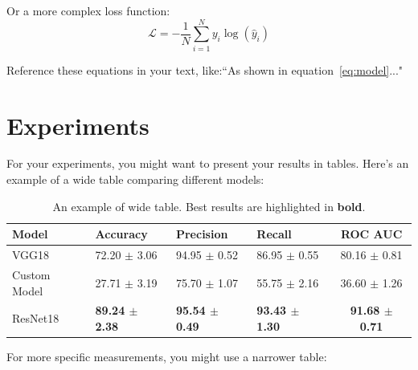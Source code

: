 \documentclass[11pt]{article}
\begin{document}
\begin{multicols*}{2}
        \noindent Or a more complex loss function:
        \begin{equation}
            \label{eq:loss}
            \mathcal{L} = -\frac{1}{N}\sum_{i=1}^{N} y_i\log(\hat{y}_i)
        \end{equation}

        \noindent Reference these equations in your text, like:``As shown in equation~\ref{eq:model}..."

        \section{Experiments}
        For your experiments, you might want to present your results in tables. Here's an example of a wide table comparing different models:

        \begin{table}[t]
            \centering
            \setlength{\tabcolsep}{3pt}
            \caption{An example of wide table. Best results are highlighted in \textbf{bold}.}
            \begin{tabularx}{\textwidth}{lYYYc}
                \toprule
                Model & Accuracy & Precision & Recall & ROC AUC\\
                \midrule
                VGG18         &  72.20 $\pm$ 3.06    &   94.95 $\pm$ 0.52     &   86.95 $\pm$ 0.55    &   80.16 $\pm$ 0.81\\
                Custom Model        &  27.71 $\pm$ 3.19    &   75.70 $\pm$ 1.07     &   55.75 $\pm$ 2.16    &   36.60 $\pm$ 1.26\\
                ResNet18    &  \textbf{89.24 $\pm$ 2.38}    &   \textbf{95.54 $\pm$ 0.49}     &   \textbf{93.43 $\pm$ 1.30}    &   \textbf{91.68 $\pm$ 0.71}\\
                \bottomrule
            \end{tabularx}
            \label{tab:Performance}
        \end{table}

        \noindent For more specific measurements, you might use a narrower table:
    

\end{multicols*}
\end{document}
